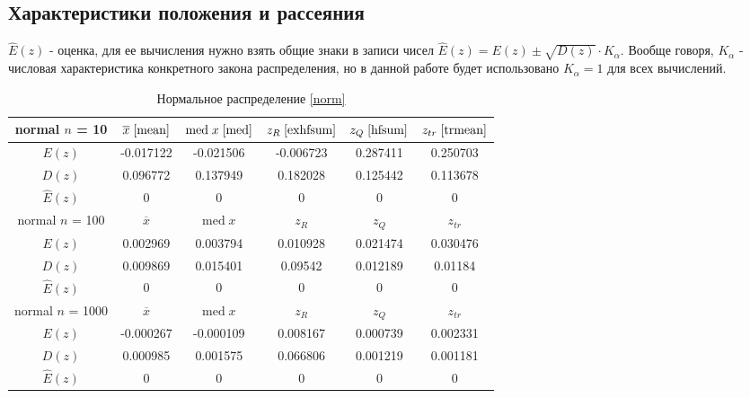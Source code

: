 \documentclass[a4paper,12pt]{article} %
\begin{document}
\subsection{Характеристики положения и рассеяния}
$\hat{E}(z)$ - оценка, для ее вычисления нужно взять общие знаки в записи чисел 
$\hat{E}(z)=E(z)\pm\sqrt{D(z)}\cdot K_\alpha$. Вообще говоря, $K_\alpha$ - числовая характеристика конкретного закона распределения, но в данной работе будет использовано $K_\alpha=1$ для всех вычислений.
\begin{table}[H]
    \centering
    \begin{tabular}{|c|c|c|c|c|c|}
        \hline
         normal $n$ = 10&$\overline{x}\;\eqref{mean}$&$\mathrm{med}\;x\;\eqref{med}$&$z_R\;\eqref{exhfsum}$&$z_Q\;\eqref{hfsum}$&$z_{tr}\;\eqref{trmean}$\\
        \hline
        $E(z)$&-0.017122&-0.021506&-0.006723&0.287411&0.250703\\
        \hline
        $D(z)$&0.096772&0.137949&0.182028&0.125442&0.113678\\
        \hline
        $\hat{E}(z)$&0&0&0&0&0\\
        \hline
        normal $n$ = 100&$\overline{x}$&$\mathrm{med}\;x$&$z_R$&$z_Q$&$z_{tr}$\\
        \hline
        $E(z)$&0.002969&0.003794&0.010928&0.021474&0.030476\\
        \hline
        $D(z)$&0.009869&0.015401&0.09542&0.012189&0.01184\\
        \hline
        $\hat{E}(z)$&0&0&0&0&0\\
        \hline
        normal $n$ = 1000 &$\overline{x}$&$\mathrm{med}\;x$&$z_R$&$z_Q$&$z_{tr}$\\
        \hline
        $E(z)$&-0.000267&-0.000109&0.008167&0.000739&0.002331\\
        \hline
        $D(z)$&0.000985&0.001575&0.066806&0.001219&0.001181\\
        \hline
        $\hat{E}(z)$&0&0&0&0&0\\
        \hline
    \end{tabular}
    \caption{Нормальное распределение \eqref{norm}}
    \label{tab:norm}
\end{table}
\end{document}
